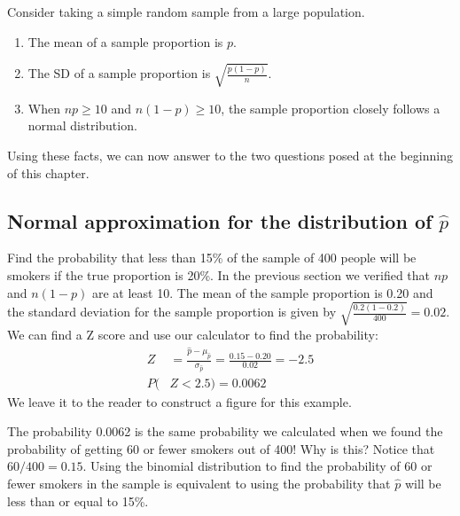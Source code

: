 \begin{tipBox}{
Consider taking a simple  random sample from a large population.
\begin{enumerate}
\setlength{\itemsep}{0mm}
\item The mean of a sample proportion is $p$.
\item The SD of a sample proportion is $\sqrt{\frac{p(1-p)}{n}}$.
\item When $np \geq 10$ and $n(1-p) \geq 10$, the sample proportion closely follows a normal distribution. 
\end{enumerate}}
\end{tipBox}

Using these facts, we can now answer to the two questions posed at the beginning of this chapter.


\subsection{Normal approximation for the distribution of $\hat{p}$}

\begin{example}{Find the probability that less than 15\% of the sample of 400 people will be smokers if the true proportion is 20\%.}
In the previous section we verified that $np$ and $n(1-p)$ are at least 10. The mean of the sample proportion is 0.20 and the standard deviation for the sample proportion is given by $\sqrt{\frac{0.2(1-0.2)}{400}}=0.02$.  We can find a Z score and use our calculator to find the probability:
\begin{align*}
Z &= \frac{\hat{p} - \mu_{\hat{p}}}{\sigma_{\hat{p}}} = \frac{0.15 - 0.20}{0.02} = -2.5 \\
P(&Z < 2.5) = 0.0062
\end{align*}
We leave it to the reader to construct a figure for this example.
\label{smokers}
\end{example}

\begin{example}{The probability 0.0062 is the same probability we calculated when we found the probability of getting 60 or fewer smokers out of 400! Why is this?}
Notice that $60/400=0.15$. Using the binomial distribution to find the probability of 60 or fewer smokers in the sample is equivalent to using the probability that $\hat{p}$ will be less than or equal to 15\%.
\end{example}


